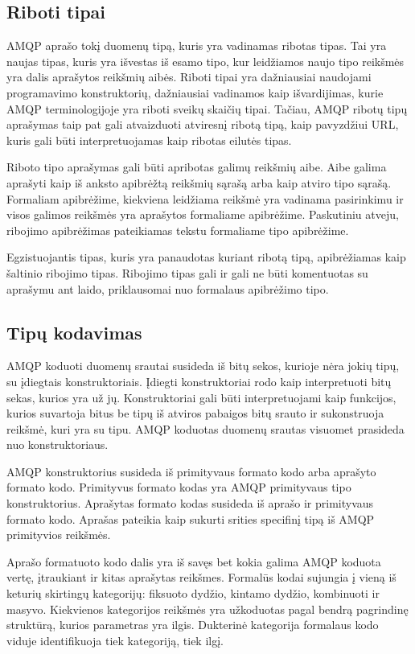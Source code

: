 \documentclass[12pt, a4paper, lithuanian]{article}
\begin{document}
    \subsection{Riboti tipai}

    AMQP aprašo tokį duomenų tipą, kuris yra vadinamas ribotas tipas.
    Tai yra naujas tipas, kuris yra išvestas iš esamo tipo, kur leidžiamos naujo tipo reikšmės yra dalis aprašytos reikšmių aibės.
    Riboti tipai yra dažniausiai naudojami programavimo konstruktorių, dažniausiai vadinamos kaip išvardijimas, kurie AMQP terminologijoje yra riboti sveikų skaičių tipai.
    Tačiau, AMQP ribotų tipų aprašymas taip pat gali atvaizduoti atviresnį ribotą tipą, kaip pavyzdžiui URL, kuris gali būti interpretuojamas kaip ribotas eilutės tipas.

    Riboto tipo aprašymas gali būti apribotas galimų reikšmių aibe.
    Aibe galima aprašyti kaip iš anksto apibrėžtą reikšmių sąrašą arba kaip atviro tipo sąrašą.
    Formaliam apibrėžime, kiekviena leidžiama reikšmė yra vadinama pasirinkimu ir visos galimos reikšmės yra aprašytos formaliame apibrėžime.
    Paskutiniu atveju, ribojimo apibrėžimas pateikiamas tekstu formaliame tipo apibrėžime.

    Egzistuojantis tipas, kuris yra panaudotas kuriant ribotą tipą, apibrėžiamas kaip šaltinio ribojimo tipas. 
    Ribojimo tipas gali ir gali ne būti komentuotas su aprašymu ant laido, priklausomai nuo formalaus apibrėžimo tipo.

    \subsection{Tipų kodavimas}

    AMQP koduoti duomenų srautai susideda iš bitų sekos, kurioje nėra jokių tipų, su įdiegtais konstruktoriais.
    Įdiegti konstruktoriai rodo kaip interpretuoti bitų sekas, kurios yra už jų.
    Konstruktoriai gali būti interpretuojami kaip funkcijos, kurios suvartoja bitus be tipų iš atviros pabaigos bitų srauto ir sukonstruoja reikšmė, kuri yra su tipu.
    AMQP koduotas duomenų srautas visuomet prasideda nuo konstruktoriaus.

    AMQP konstruktorius susideda iš primityvaus formato kodo arba aprašyto formato kodo.
    Primityvus formato kodas yra AMQP primityvaus tipo konstruktorius.
    Aprašytas formato kodas susideda iš aprašo ir primityvaus formato kodo.
    Aprašas pateikia kaip sukurti srities specifinį tipą iš AMQP primityvios reikšmės.

    Aprašo formatuoto kodo dalis yra iš savęs bet kokia galima AMQP koduota vertę, įtraukiant ir kitas aprašytas reikšmes.
    Formalūs kodai sujungia į vieną iš keturių skirtingų kategorijų: fiksuoto dydžio, kintamo dydžio, kombinuoti ir masyvo.
    Kiekvienos kategorijos reikšmės yra užkoduotas pagal bendrą pagrindinę struktūrą, kurios parametras yra ilgis.
    Dukterinė kategorija formalaus kodo viduje identifikuoja tiek kategoriją, tiek ilgį.
\end{document}
